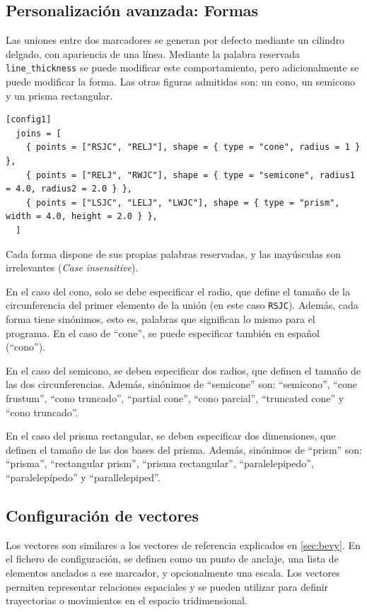 \subsection{Personalización avanzada: Formas}

Las uniones entre dos marcadores se generan por defecto mediante un cilindro delgado, con apariencia de una línea. Mediante la palabra reservada \texttt{line\_thickness} se puede modificar este comportamiento, pero adicionalmente se puede modificar la forma. Las otras figuras admitidas son: un cono, un semicono y un prisma rectangular.

\begin{lstlisting}[style=mystyle, caption={Uso de formas}, label={lst:cfg-formas}] 
[config1]
  joins = [
    { points = ["RSJC", "RELJ"], shape = { type = "cone", radius = 1 } },
    { points = ["RELJ", "RWJC"], shape = { type = "semicone", radius1 = 4.0, radius2 = 2.0 } },
    { points = ["LSJC", "LELJ", "LWJC"], shape = { type = "prism", width = 4.0, height = 2.0 } },
  ]
\end{lstlisting}

Cada forma dispone de sus propias palabras reservadas, y las mayúsculas son irrelevantes (\textit{Case insensitive}). 

En el caso del cono, solo se debe especificar el radio, que define el tamaño de la circunferencia del primer elemento de la unión (en este caso \texttt{RSJC}). Además, cada forma tiene sinónimos, esto es, palabras que significan lo mismo para el programa. En el caso de ``cone'', se puede especificar también en español (``cono'').

En el caso del semicono, se deben especificar dos radios, que definen el tamaño de las dos circunferencias. Además, sinónimos de ``semicone'' son: ``semicono'', ``cone frustum'', ``cono truncado'', ``partial cone'', ``cono parcial'', ``truncated cone'' y ``cono truncado''.

En el caso del prisma rectangular, se deben especificar dos dimensiones, que definen el tamaño de las dos bases del prisma. Además, sinónimos de ``prism'' son: ``prisma'', ``rectangular prism'', ``prisma rectangular'', ``paralelepipedo'', ``paralelepípedo'' y ``parallelepiped''.

\subsection{Configuración de vectores}

Los vectores son similares a los vectores de referencia explicados en \autoref{sec:bevy}. En el fichero de configuración, se definen como un punto de anclaje, una lista de elementos anclados a ese marcador, y opcionalmente una escala. Los vectores permiten representar relaciones espaciales y se pueden utilizar para definir trayectorias o movimientos en el espacio tridimensional.

